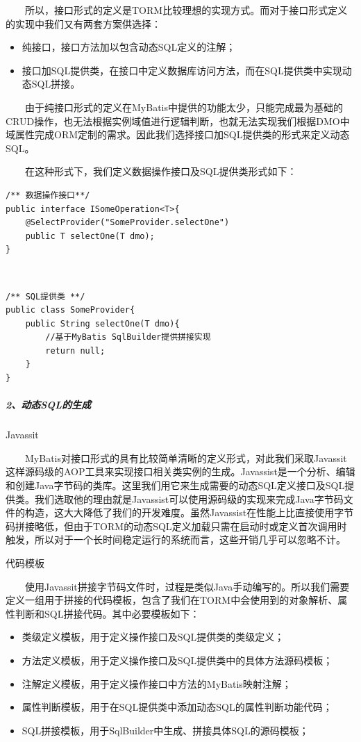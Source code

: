 \documentclass[]{article}
\begin{document}
　　所以，接口形式的定义是TORM比较理想的实现方式。而对于接口形式定义的实现中我们又有两套方案供选择：

\begin{itemize}
\itemsep1pt\parskip0pt
\item
  纯接口，接口方法加以包含动态SQL定义的注解；
\item
  接口加SQL提供类，在接口中定义数据库访问方法，而在SQL提供类中实现动态SQL拼接。
\end{itemize}

　　由于纯接口形式的定义在MyBatis中提供的功能太少，只能完成最为基础的CRUD操作，也无法根据实例域值进行逻辑判断，也就无法实现我们根据DMO中域属性完成ORM定制的需求。因此我们选择接口加SQL提供类的形式来定义动态SQL。

　　在这种形式下，我们定义数据操作接口及SQL提供类形式如下：

\begin{verbatim}
/** 数据操作接口**/
public interface ISomeOperation<T>{
    @SelectProvider("SomeProvider.selectOne")
    public T selectOne(T dmo);
}
\end{verbatim}

　　

\begin{verbatim}
/** SQL提供类 **/
public class SomeProvider{
    public String selectOne(T dmo){
        //基于MyBatis SqlBuilder提供拼接实现
        return null;
    }
}
\end{verbatim}

\subparagraph{2、动态SQL的生成}\label{ux52a8ux6001sqlux7684ux751fux6210}

Javassit

　　MyBatis对接口形式的具有比较简单清晰的定义形式，对此我们采取Javassit这样源码级的AOP工具来实现接口相关类实例的生成。Javassist是一个分析、编辑和创建Java字节码的类库。这里我们用它来生成需要的动态SQL定义接口及SQL提供类。我们选取他的理由就是Javassist可以使用源码级的实现来完成Java字节码文件的构造，这大大降低了我们的开发难度。虽然Javassist在性能上比直接使用字节码拼接略低，但由于TORM的动态SQL定义加载只需在启动时或定义首次调用时触发，所以对于一个长时间稳定运行的系统而言，这些开销几乎可以忽略不计。

代码模板

　　使用Javassit拼接字节码文件时，过程是类似Java手动编写的。所以我们需要定义一组用于拼接的代码模板，包含了我们在TORM中会使用到的对象解析、属性判断和SQL拼接代码。其中必要模板如下：

\begin{itemize}
\itemsep1pt\parskip0pt
\item
  类级定义模板，用于定义操作接口及SQL提供类的类级定义；
\item
  方法定义模板，用于定义操作接口及SQL提供类中的具体方法源码模板；
\item
  注解定义模板，用于定义操作接口中方法的MyBatis映射注解；
\item
  属性判断模板，用于在SQL提供类中添加动态SQL的属性判断功能代码；
\item
  SQL拼接模板，用于SqlBuilder中生成、拼接具体SQL的源码模板；
\end{itemize}
\end{document}
